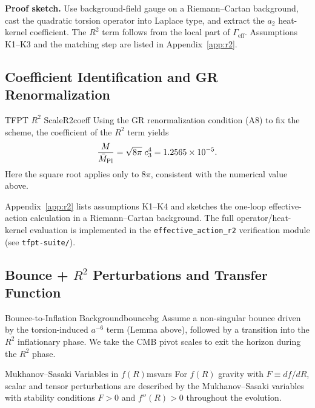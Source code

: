 \textbf{Proof sketch.} Use background-field gauge on a Riemann--Cartan background, cast the
quadratic torsion operator into Laplace type, and extract the $a_2$ heat-kernel coefficient.
The $R^2$ term follows from the local part of $\Gamma_{\mathrm{eff}}$. Assumptions K1--K3 and
the matching step are listed in Appendix~\ref{app:r2}.

\subsection{Coefficient Identification and GR Renormalization}

\begin{theorem}{TFPT $R^2$ Scale}{R2coeff}
Using the GR renormalization condition (A8) to fix the scheme, the coefficient of the
$R^2$ term yields
\begin{equation}
    \frac{M}{\bar{M}_{\mathrm{Pl}}}=\sqrt{8\pi}\;c_3^4
    = 1.2565\times 10^{-5}.
    \label{eq:R2scale}
\end{equation}
Here the square root applies only to $8\pi$, consistent with the numerical value above.
\end{theorem}

\begin{tcolorbox}[colback=green!3, colframe=green!50!black, 
    title={\textbf{Derivation Provided (Conditional)}}, fonttitle=\bfseries\small]
Appendix~\ref{app:r2} lists assumptions K1--K4 and sketches the one-loop effective-action
calculation in a Riemann--Cartan background. The full operator/heat-kernel evaluation is
implemented in the \texttt{effective\_action\_r2} verification module (see \texttt{tfpt-suite/}).
\end{tcolorbox}

\subsection{\texorpdfstring{Bounce + $R^2$ Perturbations and Transfer Function}{Bounce + R2 Perturbations and Transfer Function}}
\label{sec:bounce}

\begin{definition}{Bounce-to-Inflation Background}{bouncebg}
Assume a non-singular bounce driven by the torsion-induced $a^{-6}$ term
(Lemma above), followed by a transition into the $R^2$ inflationary phase.
We take the CMB pivot scales to exit the horizon during the $R^2$ phase.
\end{definition}

\begin{definition}{Mukhanov--Sasaki Variables in $f(R)$}{msvars}
For $f(R)$ gravity with $F \equiv df/dR$, scalar and tensor perturbations are
described by the Mukhanov--Sasaki variables with stability conditions
$F>0$ and $f''(R)>0$ throughout the evolution.
\end{definition}

